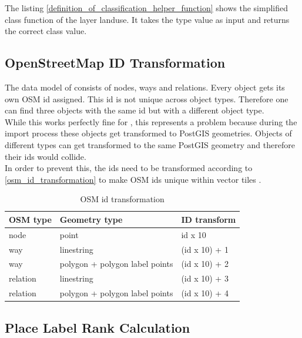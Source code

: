 The listing \autoref{definition_of_classification_helper_function} shows the simplified class function of the layer landuse. It takes the type value as input and returns the correct class value. 

\subsection{OpenStreetMap ID Transformation}

The data model of \osm{} consists of nodes, ways and relations. Every object gets its own OSM id assigned. This id is not unique across object types. Therefore one can find three objects with the same id but with a different object type.\\
While this works perfectly fine for \osm{}, this represents a problem because during the import process these \osm{} objects get transformed to PostGIS geometries. Objects of different types can get transformed to the same PostGIS geometry and therefore their ids would collide.
\\
In order to prevent this, the ids need to be transformed according to \autoref{osm_id_transformation} to make OSM ids unique within vector tiles \cite{103_mapbox.com_2016}.

\begin{table}[H]
\centering

\begin{tabular}{lll}
\hline
OSM type & Geometry type                  & \osm{} ID transform \\ \hline
node     & point                          & id x 10          \\
way      & linestring                           & (id x 10) + 1    \\
way      & polygon + polygon label points & (id x 10) + 2    \\
relation & linestring                           & (id x 10) + 3    \\
relation & polygon + polygon label points & (id x 10) + 4    \\
\end{tabular}
\caption{OSM id transformation}
\label{osm_id_transformation}
\end{table}

\subsection{Place Label Rank Calculation}\label{place_label_rank_calc}

